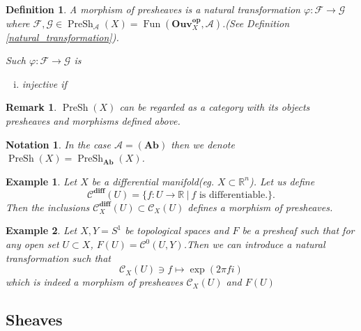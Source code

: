 \documentclass{article}
\newtheorem{definition}{Definition}[section]
\newtheorem{notation}{Notation}[section]
\newtheorem{remark}{Remark}[section]
\newtheorem{example}{Example}[section]
\numberwithin{equation}{section}
\DeclareMathOperator{\PreSh}{PreSh}
\DeclareMathOperator{\Fun}{Fun}
\begin{document}
\begin{definition}
A morphism of presheaves is a natural transformation $\varphi:\mathcal{F}\to \mathcal{G}$ where $\mathcal{F},\mathcal{G}\in\PreSh_\mathcal{A}(X)=\Fun(\mathbf{Ouv}_X^{\mathbf{op}},\mathcal{A})$.(See Definition \ref{natural_transformation}).\\
\par Such $\varphi:\mathcal{F}\to\mathcal{G}$ is 
\begin{enumerate}[i).]
\item injective if 
\end{enumerate}
\end{definition}



\begin{remark}
$\PreSh(X)$ can be regarded as a category with its objects presheaves and morphisms defined above. 
\end{remark}

\begin{notation}
In the case $\mathcal{A}= (\mathbf{Ab})$ then we denote $\PreSh(X)=\PreSh_{\mathbf{Ab}}(X)$.
\end{notation}

\begin{example}
Let $X$ be a differential manifold(eg. $X\subset\mathbb{R}^n$). Let us define 
\begin{equation*}
\mathcal{C}^{\mathbf{diff}}(U) = \{f:U\to\mathbb{R}\:|\:f\text{ is differentiable.}\}. 
\end{equation*}
Then the inclusions $\mathcal{C}_X^{\mathbf{diff}}(U)\subset\mathcal{C}_X(U)$ defines a morphism of presheaves.
\end{example}

\begin{example}
Let $X,Y=S^1$ be topological spaces and $F$ be a presheaf such that for any open set $U\subset X$, $F(U)=\mathcal{C}^0(U,Y)$.Then we can introduce a natural transformation such that 
\begin{equation*}
\mathcal{C}_X(U)\ni f\mapsto \exp(2\pi fi)
\end{equation*}
which is indeed a morphism of presheaves $\mathcal{C}_X(U)$ and $F(U)$
\end{example}

\subsection{Sheaves}
\end{document}
